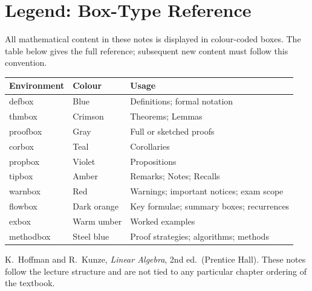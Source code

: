 \newpage
\section*{Legend: Box-Type Reference}

All mathematical content in these notes is displayed in colour-coded boxes.
The table below gives the full reference; subsequent new content must follow
this convention.

\begin{center}
\renewcommand{\arraystretch}{1.35}
\begin{tabular}{>{\ttfamily}l l p{7.5cm}}
\toprule
\textrm{\textbf{Environment}} & \textbf{Colour} & \textbf{Usage} \\
\midrule
defbox    & \textcolor{defblue}{Blue}                 & Definitions; formal notation \\
thmbox    & \textcolor{thmcrimson}{Crimson}           & Theorems; Lemmas \\
proofbox  & \textcolor{proofgray}{Gray}               & Full or sketched proofs \\
corbox    & \textcolor{corteal}{Teal}                 & Corollaries \\
propbox   & \textcolor{propviolet}{Violet}            & Propositions \\
tipbox    & \textcolor{tipamber}{Amber}               & Remarks; Notes; Recalls \\
warnbox   & \textcolor{warnred}{Red}                  & Warnings; important notices; exam scope \\
flowbox   & \textcolor{orange!65!black}{Dark orange}  & Key formulae; summary boxes; recurrences \\
exbox     & \textcolor{orange!40!brown}{Warm umber}   & Worked examples \\
methodbox & \textcolor{methodsteel}{Steel blue}       & Proof strategies; algorithms; methods \\
\bottomrule
\end{tabular}
\end{center}

\begin{tipbox}
K.\ Hoffman and R.\ Kunze, \textit{Linear Algebra}, 2nd ed.\ (Prentice Hall).
These notes follow the lecture structure and are not tied to any particular
chapter ordering of the textbook.
\end{tipbox}